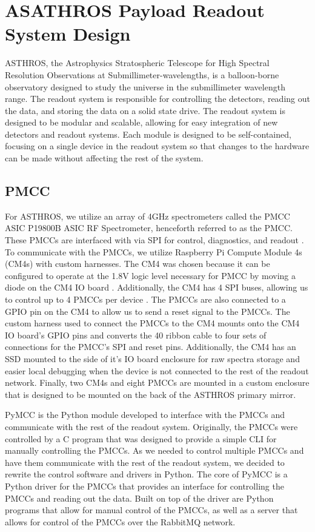 \chapter[ASATHROS Payload Readout System Design]{ASATHROS Payload Readout System Design}
ASTHROS, the Astrophysics Stratospheric Telescope for High Spectral Resolution Observations at Submillimeter-wavelengths, is a balloon-borne observatory designed to study the universe in the submillimeter wavelength range.
The readout system is responsible for controlling the detectors, reading out the data, and storing the data on a solid state drive.
The readout system is designed to be modular and scalable, allowing for easy integration of new detectors and readout systems.
Each module is designed to be self-contained, focusing on a single device in the readout system so that changes to the hardware can be made without affecting the rest of the system.



\section{PMCC}
For ASTHROS, we utilize an array of 4GHz spectrometers called the PMCC ASIC P19800B ASIC RF Spectrometer, henceforth referred to as the PMCC.
These PMCCs are interfaced with via SPI for control, diagnostics, and readout \cite{PMCCP19800B}.
To communicate with the PMCCs, we utilize Raspberry Pi Compute Module 4s (CM4s) with custom harnesses.
The CM4 was chosen because it can be configured to operate at the 1.8V logic level necessary for PMCC by moving a diode on the CM4 IO board \cite{cm4io}.
Additionally, the CM4 has 4 SPI buses, allowing us to control up to 4 PMCCs per device \cite{cm4}.
The PMCCs are also connected to a GPIO pin on the CM4 to allow us to send a reset signal to the PMCCs.
The custom harness used to connect the PMCCs to the CM4 mounts onto the CM4 IO board's GPIO pins and converts the 40 ribbon cable to four sets of connections for the PMCC's SPI and reset pins.
Additionally, the CM4 has an SSD mounted to the side of it's IO board enclosure for raw spectra storage and easier local debugging when the device is not connected to the rest of the readout network.
Finally, two CM4s and eight PMCCs are mounted in a custom enclosure that is designed to be mounted on the back of the ASTHROS primary mirror.

PyMCC is the Python module developed to interface with the PMCCs and communicate with the rest of the readout system.
Originally, the PMCCs were controlled by a C program that was designed to provide a simple CLI for manually controlling the PMCCs.
As we needed to control multiple PMCCs and have them communicate with the rest of the readout system, we decided to rewrite the control software and drivers in Python.
The core of PyMCC is a Python driver for the PMCCs that provides an interface for controlling the PMCCs and reading out the data.
Built on top of the driver are Python programs that allow for manual control of the PMCCs, as well as a server that allows for control of the PMCCs over the RabbitMQ network.


